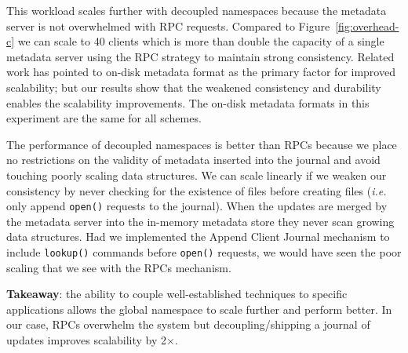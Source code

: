 This workload scales further with decoupled namespaces because the metadata
server is not overwhelmed with RPC requests. Compared to
Figure~\ref{fig:overhead-c} we can scale to 40 clients which is more than
double the capacity of a single metadata server using the RPC strategy to
maintain strong consistency. Related work has pointed to on-disk metadata
format as the primary factor for improved scalability; but our results show
that the weakened consistency and durability enables the scalability
improvements. The on-disk metadata formats in this experiment are the same for
all schemes.

The performance of decoupled namespaces is better than RPCs because we place no
restrictions on the validity of metadata inserted into the journal and avoid
touching poorly scaling data structures. We can scale linearly if we weaken our
consistency by never checking for the existence of files before creating files
({\it i.e.} only append \texttt{open()} requests to the journal).  When the
updates are merged by the metadata server into the in-memory metadata store
they never scan growing data structures.  Had we implemented the Append Client
Journal mechanism to include \texttt{lookup()} commands before \texttt{open()}
requests, we would have seen the poor scaling that we see with the RPCs
mechanism. 


%

\textbf{Takeaway}: the ability to couple well-established techniques to
specific applications allows the global namespace to scale further and perform
better. In our case, RPCs overwhelm the system but decoupling/shipping a
journal of updates improves scalability by 2\(\times\).

